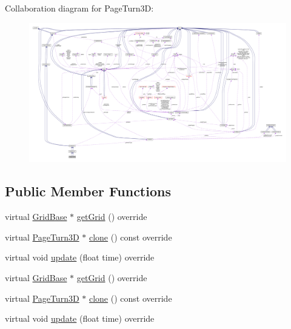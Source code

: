 Collaboration diagram for Page\+Turn3D\+:
\nopagebreak
\begin{figure}[H]
\begin{center}
\leavevmode
\includegraphics[width=350pt]{classPageTurn3D__coll__graph}
\end{center}
\end{figure}
\subsection*{Public Member Functions}
\begin{DoxyCompactItemize}
\item 
virtual \hyperlink{classGridBase}{Grid\+Base} $\ast$ \hyperlink{classPageTurn3D_a7b3315a39780438de87cbaa2c9c52c9c}{get\+Grid} () override
\item 
virtual \hyperlink{classPageTurn3D}{Page\+Turn3D} $\ast$ \hyperlink{classPageTurn3D_a98aa1300a97553c4f4185d974021bdc4}{clone} () const override
\item 
virtual void \hyperlink{classPageTurn3D_afe5bcf11756795416fc882a3b0be1c66}{update} (float time) override
\item 
virtual \hyperlink{classGridBase}{Grid\+Base} $\ast$ \hyperlink{classPageTurn3D_a69c44c157a7652d2a183dba481bce69a}{get\+Grid} () override
\item 
virtual \hyperlink{classPageTurn3D}{Page\+Turn3D} $\ast$ \hyperlink{classPageTurn3D_a4679e461471010cd87932c11be5bef9a}{clone} () const override
\item 
virtual void \hyperlink{classPageTurn3D_a5d1f2853531e5a8ee8857c287c4f3cbc}{update} (float time) override
\end{DoxyCompactItemize}
